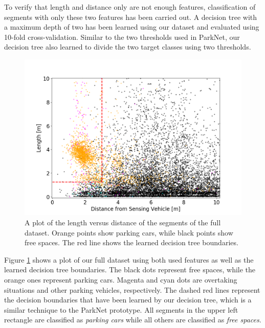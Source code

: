 To verify that length and distance only are not enough features, classification of segments with only these two features has been carried out. A decision tree with a maximum depth of two has been learned using our dataset and evaluated using 10-fold cross-validation. Similar to the two thresholds used in ParkNet, our decision tree also learned to divide the two target classes using two thresholds. 

\begin{figure}
	\centering
	\includegraphics[width=\textwidth]{img/2d_length_distance_scatter_full_dataset_decision_tree_boundaries.png}
	\caption{A plot of the length versus distance of the segments of the full dataset. Orange points show parking cars, while black points show free spaces. The red line shows the learned decision tree boundaries.}
	\label{fig:plot_2d_decision_tree}
\end{figure}

Figure \ref{fig:plot_2d_decision_tree} shows a plot of our full dataset using both used features as well as the learned decision tree boundaries. The black dots represent free spaces, while the orange ones represent parking cars. Magenta and cyan dots are overtaking situations and other parking vehicles, respectively. The dashed red lines represent the decision boundaries that have been learned by our decision tree, which is a similar technique to the ParkNet prototype. All segments in the upper left rectangle are classified as \emph{parking cars} while all others are classified as \emph{free spaces}.

